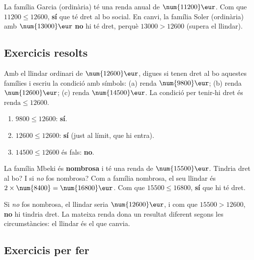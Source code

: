 \begin{exemple}
La família Garcia (ordinària) té una renda anual de $\num{11200}\eur$. Com que
$\num{11200}\le\num{12600}$, \textbf{sí} que té dret al bo social. En canvi, la
família Soler (ordinària) amb $\num{13000}\eur$ \textbf{no} hi té dret, perquè
$\num{13000}>\num{12600}$ (supera el llindar).
\end{exemple}

\subsection{Exercicis resolts}

\begin{exresolt}
Amb el llindar ordinari de $\num{12600}\eur$, digues si tenen dret al bo aquestes
famílies i escriu la condició amb símbols: (a) renda $\num{9800}\eur$; (b) renda
$\num{12600}\eur$; (c) renda $\num{14500}\eur$.
\solucio
La condició per tenir-hi dret és $\text{renda}\le\num{12600}$.
\begin{enumerate}[label=\alph*), leftmargin=1.6em]
  \item $\num{9800}\le\num{12600}$: \textbf{sí}.
  \item $\num{12600}\le\num{12600}$: \textbf{sí} (just al límit, que hi entra).
  \item $\num{14500}\le\num{12600}$ és fals: \textbf{no}.
\end{enumerate}
\end{exresolt}

\begin{exresolt}
La família Mbeki és \textbf{nombrosa} i té una renda de $\num{15500}\eur$. Tindria
dret al bo? I si \emph{no} fos nombrosa?
\solucio
Com a família nombrosa, el seu llindar és $2\times\num{8400}=\num{16800}\eur$. Com
que $\num{15500}\le\num{16800}$, \textbf{sí} que hi té dret.

Si \emph{no} fos nombrosa, el llindar seria $\num{12600}\eur$, i com que
$\num{15500}>\num{12600}$, \textbf{no} hi tindria dret. La mateixa renda dona un
resultat diferent segons les circumstàncies: el llindar és el que canvia.
\end{exresolt}

\subsection{Exercicis per fer}

